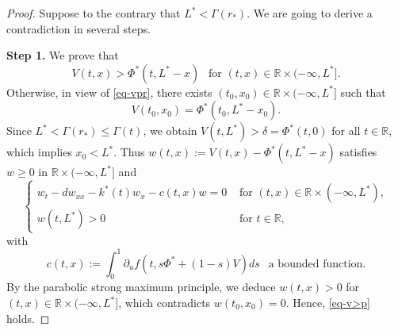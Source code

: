 \documentclass[10pt,a4paper]{amsart}
\begin{document}
\begin{proof}
Suppose to the contrary that $L^*<\Gamma(r_*)$. We are going to derive a contradiction in  several steps.

\textbf{ Step 1.} We prove that 
\begin{equation}\label{eq-v>p}
  V(t,x)> \Phi^*(t,L^*-x) ~~\text{ for } (t,x)\in\mathbb R \times(-\infty,L^*].
\end{equation}
Otherwise, in view of \eqref{eq-vpr}, there exists $(t_0,x_0)\in \mathbb R \times(-\infty,L^*]$ such that
\begin{equation*}
  V(t_0,x_0)= \Phi^*(t_0,L^*-x_0).
\end{equation*}
Since $L^*<\Gamma(r_*)\leq \Gamma(t)$, we obtain $V(t,L^*)>\delta=\Phi^*(t,0)$ for all $t\in\mathbb R$, which implies $x_0<L^*$. Thus $w(t,x):=V(t,x)-\Phi^*(t,L^*-x)$ satisfies $w\geq 0$ in $\mathbb R \times(-\infty,L^*]$ and
\begin{equation*}\begin{cases}
  w_t-dw_{xx}-k^*(t)w_x-c(t,x)w=0 &\text{ for }(t,x)\in\mathbb R \times(-\infty,L^*),\\
  w(t,L^*)> 0 &\text{ for }t\in\mathbb R,
\end{cases}
\end{equation*}
with 
$$c(t,x):=\int_0^1\partial_uf(t,s\Phi^*+(1-s)V)ds\ \  \mbox{ a bounded function.}$$
  By the parabolic strong maximum principle, we deduce  $w(t,x)>0$ for $(t,x)\in\mathbb R \times(-\infty,L^*]$, which contradicts  $w(t_0,x_0)=0$. Hence, \eqref{eq-v>p} holds.


\end{proof}
\end{document}
